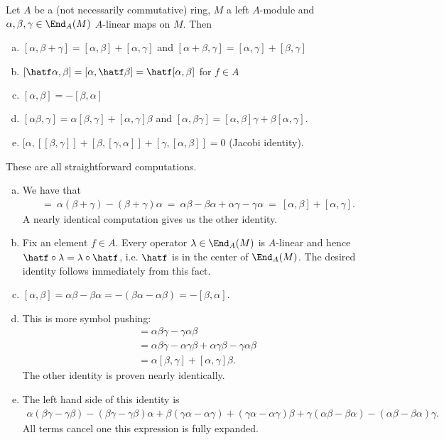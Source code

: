 \begin{prop}\label{prop:commutator-relations}
	Let $A$ be a (not necessarily commutative) ring, $M$ a left $A$-module and $\alpha,\beta,\gamma \in \End_A(M)$ $A$-linear maps on $M$. Then
	\begin{enumerate}[(a)]
		\item $[\alpha,\beta + \gamma] = [\alpha,\beta] + [\alpha, \gamma]$ and $[\alpha + \beta, \gamma] = [\alpha, \gamma] + [\beta,\gamma]$
		\item $[\hatf\alpha,\beta] = [\alpha,\hatf\beta] = \hatf[\alpha,\beta]$ for $f \in A$
		\item $[\alpha,\beta] = -[\beta,\alpha]$
		\item $[\alpha\beta,\gamma] = \alpha[\beta,\gamma] + [\alpha,\gamma]\beta$ and $[\alpha,\beta\gamma] = [\alpha,\beta]\gamma + \beta[\alpha,\gamma]$.
		\item $[\alpha,[[\beta,\gamma]] + [\beta,[\gamma,\alpha]] + [\gamma,[\alpha,\beta]] = 0$ (Jacobi identity).
	\end{enumerate}
\end{prop}
\begin{prf}
	These are all straightforward computations.
	\begin{enumerate}[(a)]
		\item We have that
			\begin{align*}
				[\alpha,\beta+\gamma] 
				  &~=~ \alpha(\beta+\gamma) - (\beta+\gamma)\alpha
				  ~=~ \alpha\beta - \beta\alpha + \alpha\gamma - \gamma\alpha
				  ~=~ [\alpha,\beta] + [\alpha,\gamma].
			\end{align*}
			A nearly identical computation gives us the other identity.
		\item Fix an element $f \in A$. Every operator $\lambda \in \End_A(M)$ is $A$-linear and hence $\hatf\circ\lambda = \lambda\circ \hatf$, i.e. $\hatf$ is in the center of $\End_A(M)$. The desired identity follows immediately from this fact.
		\item $[\alpha,\beta] = \alpha\beta - \beta\alpha = -(\beta\alpha - \alpha\beta) = -[\beta,\alpha]$. 
		\item This is more symbol pushing:
			\begin{align*}
				[\alpha\beta,\gamma] 
				  &= \alpha\beta\gamma - \gamma\alpha\beta \\
				  &= \alpha \beta\gamma - \alpha\gamma\beta + \alpha\gamma\beta - \gamma\alpha\beta \\
				  &= \alpha[\beta,\gamma] + [\alpha,\gamma]\beta.
			\end{align*}
			The other identity is proven nearly identically.
		\item The left hand side of this identity is
			\begin{align*}
				\alpha(\beta\gamma - \gamma\beta) - (\beta\gamma - \gamma\beta)\alpha + \beta(\gamma\alpha - \alpha\gamma) + (\gamma\alpha - \alpha\gamma)\beta + \gamma(\alpha\beta - \beta\alpha) - (\alpha\beta-\beta\alpha)\gamma.
			\end{align*}
			All terms cancel one this expression is fully expanded.
	\end{enumerate}
\end{prf}


